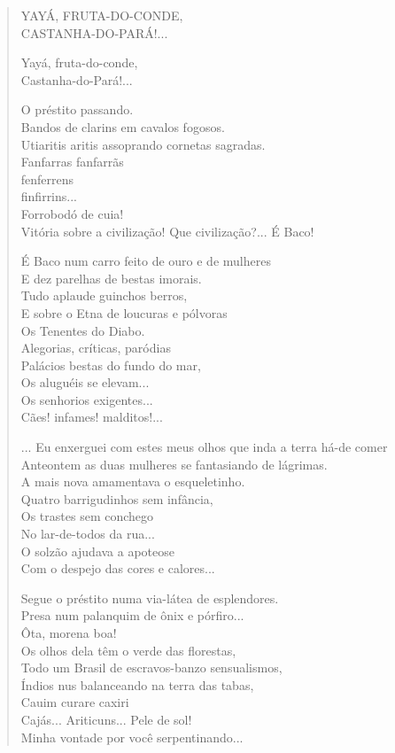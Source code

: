 \begin{verse}
\quad\quad\quad\quad\quad{}YAYÁ, FRUTA-DO-CONDE,\\
\quad\quad\quad\quad\quad{}CASTANHA-DO-PARÁ!...

\quad\quad\quad\quad\quad\quad\quad{}Yayá, fruta-do-conde,\\
\quad\quad\quad\quad\quad\quad\quad{}Castanha-do-Pará!...

O préstito passando.\\
Bandos de clarins em cavalos fogosos.\\
Utiaritis aritis assoprando cornetas sagradas.\\
Fanfarras fanfarrãs\\
\quad\quad\quad{}fenferrens\\
\quad\quad\quad\quad{}finfirrins...\\
\quad\quad\quad\quad\quad{}Forrobodó de cuia!\\
Vitória sobre a civilização! Que civilização?... É Baco!

É Baco num carro feito de ouro e de mulheres\\
E dez parelhas de bestas imorais.\\
Tudo aplaude guinchos berros,\\
E sobre o Etna de loucuras e pólvoras\\
Os Tenentes do Diabo.\\
Alegorias, críticas, paródias\\
Palácios bestas do fundo do mar,\\
Os aluguéis se elevam...\\
\quad{}Os senhorios exigentes...\\
\quad\quad{}Cães! infames! malditos!...

... Eu enxerguei com estes meus olhos que inda a terra há-de comer\\
Anteontem as duas mulheres se fantasiando de lágrimas.\\
A mais nova amamentava o esqueletinho.\\
Quatro barrigudinhos sem infância,\\
Os trastes sem conchego\\
No lar-de-todos da rua...\\
O solzão ajudava a apoteose\\
Com o despejo das cores e calores...

Segue o préstito numa via-látea de esplendores.\\
Presa num palanquim de ônix e pórfiro...\\
Ôta, morena boa!\\
Os olhos dela têm o verde das florestas,\\
Todo um Brasil de escravos-banzo sensualismos,\\
Índios nus balanceando na terra das tabas,\\
Cauim curare caxiri\\
Cajás... Ariticuns... Pele de sol!\\
Minha vontade por você serpentinando...


\end{verse}
